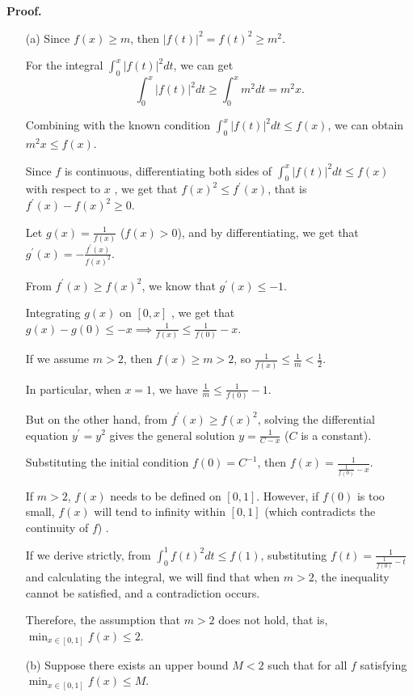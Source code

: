 \documentclass[a4paper, 11pt]{article}
\newenvironment{solution}
    {\textbf{Proof.}}
    {}
\begin{document}
\begin{solution}
\begin{enumerate}
\item[(a)]Since \(f(x)\geq m\), then \(|f(t)|^2 = f(t)^2\geq m^2\). 

For the integral \(\int_{0}^{x}|f(t)|^2dt\), we can get 
$$
\int_{0}^{x}|f(t)|^2dt\geq\int_{0}^{x}m^2dt = m^2x.
$$

Combining with the known condition \(\int_{0}^{x}|f(t)|^2dt\leq f(x)\), we can obtain \(m^2x\leq f(x)\).

Since \(f\) is continuous, differentiating both sides of \(\int_{0}^{x}|f(t)|^2dt\leq f(x)\) with respect to \(x\) , we get that \(f(x)^2\leq f^\prime(x)\), that is \(f^\prime(x)-f(x)^2\geq0\).

Let \(g(x)=\frac{1}{f(x)}\) (\(f(x)>0\)), and by differentiating, we get that \(g^\prime(x)=-\frac{f^\prime(x)}{f(x)^2}\).

From \(f^\prime(x)\geq f(x)^2\), we know that \(g^\prime(x)\leq - 1\).

Integrating \(g(x)\) on \([0,x]\) , we get that \(g(x)-g(0)\leq -x\implies\frac{1}{f(x)}\leq\frac{1}{f(0)}-x\).

If we assume \(m > 2\), then \(f(x)\geq m > 2\), so \(\frac{1}{f(x)}\leq\frac{1}{m}<\frac{1}{2}\). 

In particular, when \(x = 1\), we have \(\frac{1}{m}\leq\frac{1}{f(0)}-1\).

But on the other hand, from \(f^\prime(x)\geq f(x)^2\), solving the differential equation \(y^\prime = y^2\) gives the general solution \(y = \frac{1}{C - x}\) (\(C\) is a constant). 

Substituting the initial condition \(f(0)=C^{-1}\), then \(f(x)=\frac{1}{\frac{1}{f(0)}-x}\).

If \(m > 2\), \(f(x)\) needs to be defined on \([0,1]\). However, if \(f(0)\) is too small, \(f(x)\) will tend to infinity within \([0,1]\) (which contradicts the continuity of \(f\)) .

If we derive strictly, from \(\int_{0}^{1}f(t)^2dt\leq f(1)\), substituting \(f(t)=\frac{1}{\frac{1}{f(0)}-t}\) and calculating the integral, we will find that when \(m > 2\), the inequality cannot be satisfied, and a contradiction occurs.

Therefore, the assumption that \(m > 2\) does not hold, that is, \(\min_{x\in[0,1]}f(x)\leq2\).
	
	\item[(b)]
	Suppose there exists an upper bound \( M < 2 \) such that for all \( f \) satisfying \( \min_{x \in [0,1]} f(x) \leq M \).
	

\end{enumerate}
\end{solution}
\end{document}
